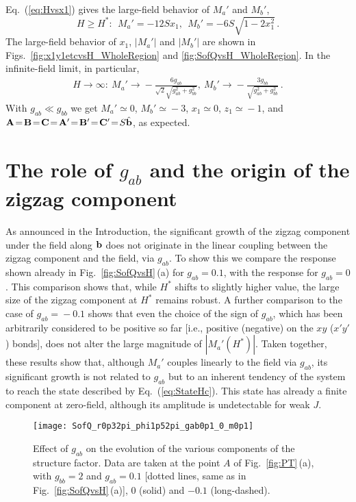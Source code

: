 \documentclass[prx,aps,groupedaddress,twocolumn]{revtex4-1}
\def\cdbl{\color{darkblue}}
\def\be{\begin{equation}}
\def\ee{\end{equation}}
\begin{document}
Eq.~(\ref{eq:Hvsx1}) gives the large-field behavior of $M_a'$ and $M_b'$,
\be
H\ge H^\ast: ~~ M_a'=-12S x_1, ~~M_b' = - 6S \sqrt{1-2x_1^2}\,.
\ee
The large-field behavior of $x_1$, $|M_a'|$ and $|M_b'|$ are shown in Figs.~\ref{fig:x1y1etcvsH_WholeRegion} and \ref{fig:SofQvsH_WholeRegion}.
%
In the infinite-field limit, in particular, 
\be
\begin{array}{c}
H\!\to\!\infty:
~
M_a' \!\to\! -\frac{6g_{ab}}{\sqrt{2}\sqrt{g_{ab}^2+g_{bb}^2}},
~
M_b ' \!\to\! -\frac{3g_{bb}}{\sqrt{g_{ab}^2+g_{bb}^2}}\,.
\end{array}
\ee
With $g_{ab}\!\ll\!g_{bb}$ we get $M_a'\!\simeq\!0$,  $M_b'\!\simeq\!-3$, $x_1\!\simeq\!0$, $z_1\!\simeq\!-1$, and ${\bf A}\!=\!{\bf B}\!=\!{\bf C}\!=\!{\bf A}'\!=\!{\bf B}'\!=\!{\bf C}'\!=\!S \hat{{\bf b}}$, as expected. 


\vspace*{-0.25cm}
\section{The role of $g_{ab}$ and the origin of the zigzag component}
\vspace*{-0.3cm}
As announced in the Introduction, the significant growth of the zigzag component under the field along ${\bf b}$ does not originate in the linear coupling between the zigzag component and the field, via $g_{ab}$. 
%
To show this we compare the response shown already in Fig.~\ref{fig:SofQvsH}\,(a) for $g_{ab}\!=\!0.1$, with the response for $g_{ab}\!=\!0$. 
%
This comparison shows that, while $H^\ast$ shifts to slightly higher value, the large size of the zigzag component at $H^\ast$ remains robust. 
%
A further comparison to the case of $g_{ab}\!=\!-0.1$ shows that even the choice of the sign of $g_{ab}$, which has been arbitrarily considered to be positive so far [i.e., positive (negative) on the $xy$ ($x'y'$) bonds], does not alter the large magnitude of $|M_a'(H^\ast)|$. 
%
Taken together, these results show that, although $M_a'$ couples linearly to the field via $g_{ab}$, its significant growth is not related to $g_{ab}$ but to an inherent tendency of the system to reach the state described by Eq.~(\ref{eq:StateHc}). This state has already a finite component at zero-field, although its amplitude is undetectable for weak $J$. 

\begin{figure}[!t]
\texttt{[image: SofQ\_r0p32pi\_phi1p52pi\_gab0p1\_0\_m0p1]}
\caption{
Effect of $g_{ab}$ on the evolution of the various components of the structure factor. 
%
Data are taken at the point $A$ of Fig.~\ref{fig:PT}\,(a), with   $g_{bb}\!=\!2$ and $g_{ab}\!=\!0.1$ [dotted lines, same as in Fig.~\ref{fig:SofQvsH}\,(a)], 0 (solid) and $-0.1$ (long-dashed).}
\vspace*{-0.25cm}
\label{fig:gab}
\end{figure}
\end{document}
